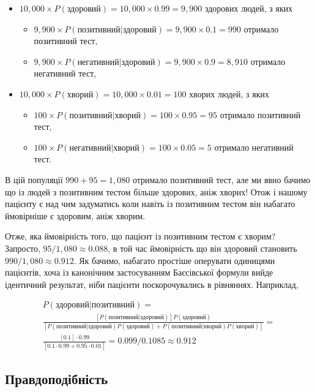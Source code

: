 \documentclass[
  11pt,
]{book}
\begin{document}
\begin{itemize}
\item
  \(10,000 \times P(\text{здоровий}) = 10,000 \times 0.99 = 9,900\) здорових людей, з яких

  \begin{itemize}
  \item
    \(9,900 \times P(\text{позитивний|здоровий}) = 9,900 \times 0.1 = 990\) отримало позитивний тест,
  \item
    \(9,900 \times P(\text{негативний|здоровий}) = 9,900 \times 0.9 = 8,910\) отримало негативний тест,
  \end{itemize}
\item
  \(10,000 \times P(\text{хворий}) = 10,000 \times 0.01 = 100\) хворих людей, з яких

  \begin{itemize}
  \item
    \(100 \times P(\text{позитивний|хворий}) = 100 \times 0.95 = 95\) отримало позитивний тест,
  \item
    \(100 \times P(\text{негативний|хворий}) = 100 \times 0.05 = 5\) отримало негативний тест.
  \end{itemize}
\end{itemize}

В цій популяції \(990 + 95 = 1,080\) отримало позитивний тест, але ми явно бачимо що із людей з позитивним тестом більше здорових, аніж хворих! Отож і нашому пацієнту є над чим задуматись коли навіть із позитивним тестом він набагато ймовірніше є здоровим, аніж хворим.

Отже, яка ймовірність того, що пацієнт із позитивним тестом є хворим? Запросто, \(95/1,080 \approx 0.088\), в той час ймовірність що він здоровий становить \(990/1,080 \approx 0.912\). Як бачимо, набагато простіше оперувати одиницями пацієнтів, хоча із канонічним застосуванням Баєсівської формули вийде ідентичний результат, ніби пацієнти поскорочувались в рівняннях. Наприклад,

\[
\begin{aligned}
  P(\text{здоровий|позитивний}) = \\ 
  \frac{[P(позитивний|здоровий)] P(здоровий)}{[P(позитивний|здоровий) P(здоровий) + P(позитивний|хворий) P(хворий)]} = \\
  \frac{[0.1] \cdot 0.99}{[0.1 \cdot 0.99 + 0.95 \cdot 0.01]} = 0.099/0.1085 \approx 0.912
\end{aligned}
\]

\subsection{Правдоподібність}\label{mle}
\end{document}
